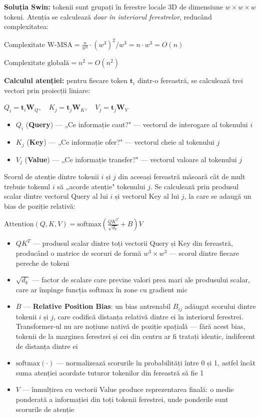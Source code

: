 \documentclass[12pt, a4paper]{report}
\newcommand{\formula}[1]{%
    \begin{center}
        \colorbox{codebackground}{%
            \parbox{0.88\textwidth}{\centering\vspace{4pt}$#1$\vspace{4pt}}%
        }
    \end{center}
}
\begin{document}
\textbf{Soluția Swin:} tokenii sunt grupați în ferestre locale 3D de dimensiune
$w \times w \times w$ tokeni. Atenția se calculează \textit{doar în interiorul
ferestrelor}, reducând complexitatea:

\formula{
    \text{Complexitate W-MSA} = \frac{n}{w^3} \cdot (w^3)^2 / w^3 = n \cdot w^3 = O(n)
}
\formula{
    \text{Complexitate globală} = n^2 = O(n^2)
}


\textbf{Calculul atenției:} pentru fiecare token $\mathbf{t}_i$ dintr-o fereastră,
se calculează trei vectori prin proiecții liniare:

\formula{
    Q_i = \mathbf{t}_i \mathbf{W}_Q, \quad
    K_j = \mathbf{t}_j \mathbf{W}_K, \quad
    V_j = \mathbf{t}_j \mathbf{W}_V
}

\begin{itemize}
    \item $Q_i$ (\textbf{Query}) — „Ce informație caut?" — vectorul de interogare al tokenului $i$
    \item $K_j$ (\textbf{Key}) — „Ce informație ofer?" — vectorul cheie al tokenului $j$
    \item $V_j$ (\textbf{Value}) — „Ce informație transfer?" — vectorul valoare al tokenului $j$
\end{itemize}

Scorul de atenție dintre tokenii $i$ și $j$ din aceeași fereastră
măsoară cât de mult trebuie tokenul $i$ să „acorde atenție"
tokenului $j$. Se calculează prin produsul scalar dintre vectorul
Query al lui $i$ și vectorul Key al lui $j$, la care se adaugă
un bias de poziție relativă:

\formula{
    \text{Attention}(Q, K, V) = \text{softmax}\!\left(
    \frac{QK^T}{\sqrt{d_k}} + B\right) V
}

\begin{itemize}
    \item $QK^T$ --- produsul scalar dintre toți vectorii Query și
    Key din fereastră, producând o matrice de scoruri de formă
    $w^3 \times w^3$ — scorul dintre fiecare pereche de tokeni
    \item $\sqrt{d_k}$ --- factor de scalare care previne valori
    prea mari ale produsului scalar, care ar împinge funcția
    softmax în zone cu gradient mic
    \item $B$ --- \textbf{Relative Position Bias}: un bias
    antrenabil $B_{ij}$ adăugat scorului dintre tokenii $i$ și $j$,
    care codifică distanța relativă dintre ei în interiorul
    ferestrei. Transformer-ul nu are noțiune nativă de poziție
    spațială — fără acest bias, tokenii de la marginea ferestrei
    și cei din centru ar fi tratați identic, indiferent de distanța
    dintre ei
    \item $\text{softmax}(\cdot)$ --- normalizează scorurile în
    probabilități între 0 și 1, astfel încât suma atenției acordate
    tuturor tokenilor din fereastră să fie 1
    \item $V$ --- înmulțirea cu vectorii Value produce reprezentarea
    finală: o medie ponderată a informației din toți tokenii
    ferestrei, unde ponderile sunt scorurile de atenție
\end{itemize}
\end{document}
